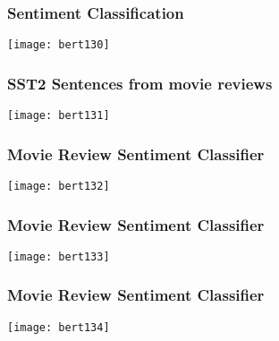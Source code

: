 \begin{frame}[fragile]\frametitle{Sentiment Classification}

			\begin{center}
			\texttt{[image: bert130]}
			\end{center}	


\end{frame}

\begin{frame}[fragile]\frametitle{ SST2 Sentences from movie reviews}

			\begin{center}
			\texttt{[image: bert131]}
			\end{center}	


\end{frame}

\begin{frame}[fragile]\frametitle{ Movie Review Sentiment Classifier}

			\begin{center}
			\texttt{[image: bert132]}
			\end{center}	


\end{frame}

\begin{frame}[fragile]\frametitle{ Movie Review Sentiment Classifier}

			\begin{center}
			\texttt{[image: bert133]}
			\end{center}	


\end{frame}

\begin{frame}[fragile]\frametitle{ Movie Review Sentiment Classifier}

			\begin{center}
			\texttt{[image: bert134]}
			\end{center}	


\end{frame}

